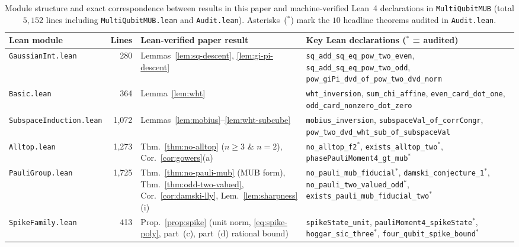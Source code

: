 \documentclass[11pt,a4paper]{article}
\theoremstyle{plain}
\theoremstyle{definition}
\theoremstyle{remark}
\newcommand{\leantab}[1]{\texttt{\scriptsize #1}}
\numberwithin{equation}{section}
\begin{document}
\begin{table}[htbp]
\centering
\caption{Module structure and exact correspondence between results in this paper and machine-verified Lean~4 declarations in \texttt{MultiQubitMUB} (total $5{,}152$ lines including \texttt{MultiQubitMUB.lean} and \texttt{Audit.lean}). Asterisks~($^*$) mark the $10$ headline theorems audited in \texttt{Audit.lean}.}\label{tab:lean-map}
\smallskip
\footnotesize
\setlength{\tabcolsep}{4pt}
\renewcommand{\arraystretch}{1.22}
\begin{tabular}{@{}l r >{\raggedright\arraybackslash}p{3.8cm} >{\raggedright\arraybackslash}p{6.4cm}@{}}
\toprule
Lean module & Lines & Lean-verified paper result & Key Lean declarations ($^*$ = audited) \\
\midrule
\leantab{GaussianInt.lean} & 280 & Lemmas~\ref{lem:sq-descent}, \ref{lem:gi-pi-descent} &
  \leantab{sq\_add\_sq\_eq\_pow\_two\_even}, \leantab{sq\_add\_sq\_eq\_pow\_two\_odd}, \leantab{pow\_giPi\_dvd\_of\_pow\_two\_dvd\_norm} \\
\leantab{Basic.lean} & 364 & Lemma~\ref{lem:wht} &
  \leantab{wht\_inversion}, \leantab{sum\_chi\_affine}, \leantab{even\_card\_dot\_one}, \leantab{odd\_card\_nonzero\_dot\_zero} \\
\leantab{SubspaceInduction.lean} & 1{,}072 & Lemmas~\ref{lem:mobius}--\ref{lem:wht-subcube} &
  \leantab{mobius\_inversion}, \leantab{subspaceVal\_of\_corrCongr}, \leantab{pow\_two\_dvd\_wht\_sub\_of\_subspaceVal} \\
\leantab{Alltop.lean} & 1{,}273 & Thm.~\ref{thm:no-alltop} ($n\ge 3$ \& $n=2$), Cor.~\ref{cor:gowers}(a) &
  \leantab{no\_alltop\_f2}$^*$, \leantab{exists\_alltop\_two}$^*$, \leantab{phasePauliMoment4\_gt\_mub}$^*$ \\
\leantab{PauliGroup.lean} & 1{,}725 & Thm.~\ref{thm:no-pauli-mub} (MUB form), Thm.~\ref{thm:odd-two-valued}, Cor.~\ref{cor:damski-lly}, Lem.~\ref{lem:sharpness}(i) &
  \leantab{no\_pauli\_mub\_fiducial}$^*$, \leantab{damski\_conjecture\_1}$^*$, \leantab{no\_pauli\_two\_valued\_odd}$^*$, \leantab{exists\_pauli\_mub\_fiducial\_two}$^*$ \\
\leantab{SpikeFamily.lean} & 413 & Prop.~\ref{prop:spike} (unit norm, \eqref{eq:spike-poly}, part~(c), part~(d) rational bound) &
  \leantab{spikeState\_unit}, \leantab{pauliMoment4\_spikeState}$^*$, \leantab{hoggar\_sic\_three}$^*$, \leantab{four\_qubit\_spike\_bound}$^*$ \\
\bottomrule
\end{tabular}
\end{table}
\end{document}

